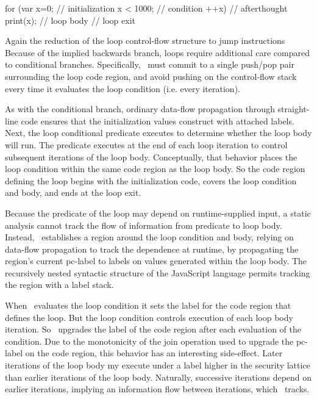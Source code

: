 \begin{jscode}
  for (var x=0;      // initialization
       x < 1000;     // condition
       ++x) {        // afterthought
    print(x);        // loop body
  }
  // loop exit
\end{jscode}

Again the reduction of the loop control-flow structure to jump instructions
Because of the implied backwards branch, loops require additional care compared to conditional branches.
Specifically, \FlowCore\ must commit to a single push/pop pair surrounding the loop code region, and avoid pushing on the control-flow stack every time it evaluates the loop condition (i.e. every iteration).

As with the conditional branch, ordinary data-flow propagation through straight-line code ensures that the initialization values construct with attached labels.
Next, the loop conditional predicate executes to determine whether the loop body will run.
The predicate executes at the end of each loop iteration to control subsequent iterations of the loop body.
Conceptually, that behavior places the loop condition within the same code region as the loop body.
So the code region defining the loop begins with the initialization code, covers the loop condition and body, and ends at the loop exit.

Because the predicate of the loop may depend on runtime-supplied input, a static analysis cannot track the flow of information from predicate to loop body.
Instead, \FlowCore\ establishes a region around the loop condition and body, relying on data-flow propagation to track the dependence at runtime, by propagating the region's current pc-label to labels on values generated within the loop body.
The recursively nested syntactic structure of the JavaScript language permits tracking the region with a label stack.

When \FlowCore\ evaluates the loop condition it sets the label for the code region that defines the loop.
But the loop condition controls execution of each loop body iteration.
So \FlowCore\ upgrades the label of the code region after each evaluation of the condition.
Due to the monotonicity of the join operation used to upgrade the pc-label on the code region, this behavior has an interesting side-effect.
Later iterations of the loop body my execute under a label higher in the security lattice than earlier iterations of the loop body.
Naturally, successive iterations depend on earlier iterations, implying an information flow between iterations, which \FlowCore\ tracks.

